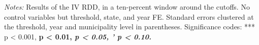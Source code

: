 \begin{table}
   \par \raggedright 
   \footnotesize{\textit{Notes:} Results of the \ac{IV} \ac{RDD}, in a ten-percent window around the cutoffs. No control variables but threshold, state, and year \ac{FE}. Standard errors clustered at the threshold, year and municipality level in parentheses. Significance codes: *** p < 0.001, \textbf{ p < 0.01, \textit{ p < 0.05, ' p < 0.10.}}}
\end{table}


